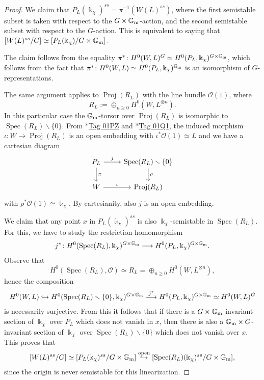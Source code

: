 \documentclass{amsart}
\newcommand{\bG}{\mathbb{G}}
\newcommand{\cO}{\mathcal{O}}
\newcommand{\spec}{\operatorname{Spec}}
\newcommand{\Proj}{\operatorname{Proj}}
\newcommand{\Gm}{\bG_{{\rm m}}}
\theoremstyle{definition}
\theoremstyle{definition}
\begin{document}
{\begin{proof}
    We claim that $P_L(\Bbbk_\chi)^{ss}=\pi^{-1}(W(L)^{ss})$, where the first semistable subset is taken with respect to the $G\times \Gm$-action, and the second semistable subset with respect to the $G$-action. This is equivalent to saying that $[W(L)^{ss}/G]\simeq [P_L(\Bbbk_\chi)/G\times \Gm]$.

    The claim follows from the equality $\pi^*\colon H^0(W,L)^{G} \simeq H^0(P_L,\Bbbk_\chi)^{G\times \Gm}$, which follows from the fact that $\pi^*\colon H^0(W,L) \simeq H^0(P_L,\Bbbk_\chi)^{\Gm}$ is an isomorphism of $G$-representations.

    The same argument applies to $\Proj(R_L)$ with the line bundle $\cO(1)$, where
    \[ R_L:= \oplus_{n\geq 0} H^0(W,L^{\otimes n}).\]
    In this particular case the $\Gm$-torsor over $\Proj(R_L)$ is isomorphic to $\spec(R_L)\smallsetminus\{0\}$. From \cite{stacks-project}*{\href{https://stacks.math.columbia.edu/tag/01PZ}{Tag 01PZ}} and \cite{stacks-project}*{\href{https://stacks.math.columbia.edu/tag/01PZ}{Tag 01Q1}}, the induced morphism $\iota:W\to \Proj(R_L)$ is an open embedding with $\iota^*\cO(1)\simeq L$ and we have a cartesian diagram
    \[
    \begin{tikzcd}
        P_L \ar[r, "j"] \ar[d, "\pi"] & \spec(R_L)\smallsetminus\{0\} \ar[d, "\rho"] \\
        W \ar[r, "\iota"] & \Proj(R_L)
    \end{tikzcd}
    \]
    with $\rho^*\cO(1)\simeq \Bbbk_\chi$. By cartesianity, also $j$ is an open embedding.

    We claim that any point $x$ in $P_L(\Bbbk_\chi)^{ss}$ is also $\Bbbk_\chi$-semistable in $\spec(R_L)$. For this, we have to study the restriction homomorphism
    \[ j^*\colon H^0(\spec(R_L),\Bbbk_\chi)^{G\times\Gm} \longrightarrow H^0(P_L,\Bbbk_\chi)^{G\times \Gm}.\]
    Observe that
    \[
        H^0(\spec(R_L),\cO)\simeq R_L = \oplus_{n\geq 0} H^0(W,L^{\otimes n}),
    \]
    hence the composition
    \begin{align*}
        H^0(W,L) \hookrightarrow H^0(\spec(R_L)\smallsetminus\{0\},\Bbbk_\chi)^{G\times \Gm} \overset{j^*}{\longrightarrow} H^0(P_L,\Bbbk_\chi)^{G\times\Gm} \simeq H^0(W,L)^G
    \end{align*}
    is necessarily surjective. From this it follows that if there is a $G\times \Gm$-invariant section of $\Bbbk_\chi$ over $P_L$ which does not vanish in $x$, then there is also a $\Gm\times G$-invariant section of $\Bbbk_\chi$ over $\spec(R_L)\smallsetminus\{0\}$ which does not vanish over $x$. This proves that
    \[
    [W(L)^{ss} /G] \simeq [P_L(\Bbbk_\chi)^{ss} / G\times\Gm ] \overset{\text{open}}{\hookrightarrow} [\spec(R_L)(\Bbbk_\chi)^{ss}/G\times\Gm],
    \]
    since the origin is never semistable for this linearization.


\end{proof}}
\end{document}
